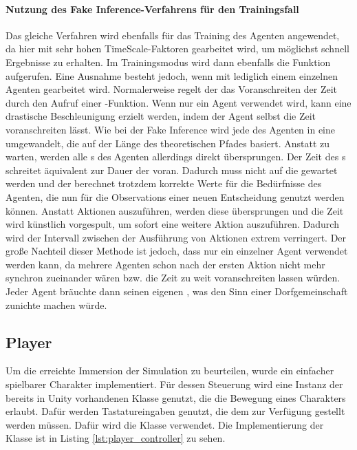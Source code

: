 \paragraph{Nutzung des Fake Inference-Verfahrens für den Trainingsfall}
Das gleiche Verfahren wird ebenfalls für das Training des Agenten angewendet, da hier mit sehr hohen TimeScale-Faktoren gearbeitet wird, um möglichst schnell Ergebnisse zu erhalten. Im Trainingsmodus wird dann ebenfalls die Funktion  aufgerufen.
Eine Ausnahme besteht jedoch, wenn mit lediglich einem einzelnen Agenten gearbeitet wird. Normalerweise regelt der  das Voranschreiten der Zeit durch den Aufruf einer -Funktion. Wenn nur ein Agent verwendet wird, kann eine drastische Beschleunigung erzielt werden, indem der Agent selbst die Zeit voranschreiten lässt. Wie bei der Fake Inference wird jede  des Agenten in eine  umgewandelt, die auf der Länge des theoretischen Pfades basiert. Anstatt zu warten, werden alle s des Agenten allerdings direkt übersprungen. Der Zeit des s schreitet äquivalent zur Dauer der  voran. Dadurch muss nicht auf die  gewartet werden und der  berechnet trotzdem korrekte Werte für die Bedürfnisse des Agenten, die nun für die Observations einer neuen Entscheidung genutzt werden können.
Anstatt Aktionen auszuführen, werden diese übersprungen und die Zeit wird künstlich vorgespult, um sofort eine weitere Aktion auszuführen. Dadurch wird der Intervall zwischen der Ausführung von Aktionen extrem verringert. Der große Nachteil dieser Methode ist jedoch, dass nur ein einzelner Agent verwendet werden kann, da mehrere Agenten schon nach der ersten Aktion nicht mehr synchron zueinander wären bzw. die Zeit zu weit voranschreiten lassen würden. Jeder Agent bräuchte dann seinen eigenen , was den Sinn einer Dorfgemeinschaft zunichte machen würde.


\subsection{Player}\label{player}
Um die erreichte Immersion der Simulation zu beurteilen, wurde ein einfacher spielbarer Charakter implementiert. Für dessen Steuerung wird eine Instanz der bereits in Unity vorhandenen Klasse  genutzt, die die Bewegung eines Charakters erlaubt. Dafür werden Tastatureingaben genutzt, die dem  zur Verfügung gestellt werden müssen. Dafür wird die Klasse  verwendet. Die Implementierung der Klasse ist in Listing \ref{lst:player_controller} zu sehen.

